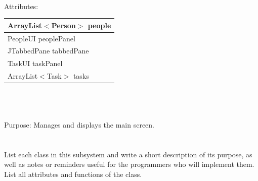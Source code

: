 \\
Attributes: \\
\begin{tabular}{| l |}
\hline
ArrayList$<$Person$>$ people\\
\hline
PeopleUI peoplePanel\\
\hline
JTabbedPane tabbedPane\\
\hline
TaskUI taskPanel\\
\hline
ArrayList$<$Task$>$ tasks\\
\hline
\end{tabular}\\
\\
\\
Purpose: Manages and displays the main screen.\\
\\
\\
List each class in this subsystem and write a short description of its purpose,
as well as notes or reminders useful for the programmers who will implement them.
List all attributes and functions of the class.